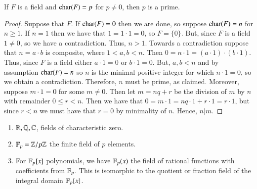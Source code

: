\documentclass[12pt, a4paper, oneside, openright, titlepage]{book}
\begin{document}
\begin{rmk}
    If $F$ is a field and $\operatorname{char}(F) = p$ for $p \neq 0$, then $p$ is a prime.
\end{rmk}
\begin{proof}
    Suppose that $F$. If $\operatorname{char}(F) = 0$ then we are done, so suppose $\operatorname{char}(F) = n$ for $n \geq 1$. If $n = 1$ then we have that $1 = 1\cdot 1 = 0$, so $F = \{0\}$. But, since $F$ is a field $1 \neq 0$, so we have a contradiction. Thus, $n > 1$. Towards a contradiction suppose that $n = a\cdot b$ is composite, where $1 < a,b < n$. Then $0 = n\cdot 1 = (a\cdot 1)\cdot (b\cdot 1)$. Thus, since $F$ is a field either $a\cdot 1 = 0$ or $b \cdot 1 = 0$. But, $a,b < n$ and by assumption $\operatorname{char}(F) = n$ so $n$ is the minimal positive integer for which $n\cdot 1 = 0$, so we obtain a contradiction. Therefore, $n$ must be prime, as claimed. Moreover, suppose $m \cdot 1 = 0$ for some $m \neq 0$. Then let $m = nq + r$ be the division of $m$ by $n$ with remainder $0\leq r<n$. Then we have that $0 = m\cdot 1 = nq\cdot 1 + r\cdot 1 = r\cdot 1$, but since $r < n$ we must have that $r = 0$ by minimality of $n$. Hence, $n \vert m$.
\end{proof}

\begin{eg}
    \leavevmode
    \begin{enumerate}
        \item $\mathbb R, \mathbb Q, \mathbb C$, fields of characteristic zero.
        \item $\mathbb F_p = \mathbb Z/p\mathbb Z$ the finite field of $p$ elements.
        \item For $\mathbb F_p[x]$ polynomials, we have $\mathbb F_p(x)$ the field of rational functions with coefficients from $\mathbb F_p$. This is isomorphic to the quotient or fraction field of the integral domain $\mathbb F_p[x]$.
    \end{enumerate}
\end{eg}
\end{document}
